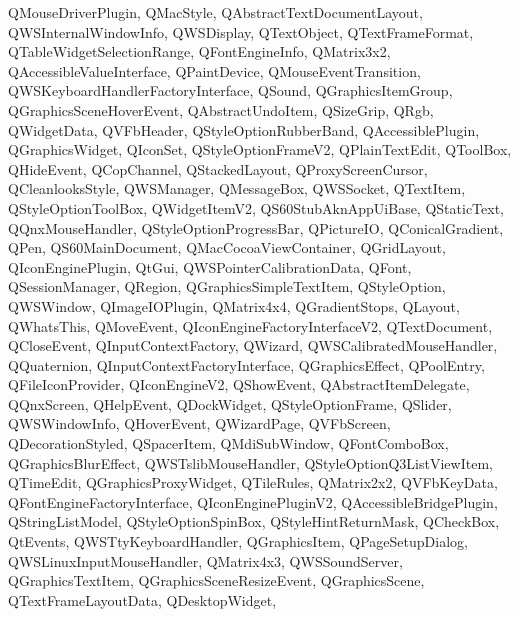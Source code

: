 {{    QMouseDriverPlugin,%
    QMacStyle,%
    QAbstractTextDocumentLayout,%
    QWSInternalWindowInfo,%
    QWSDisplay,%
    QTextObject,%
    QTextFrameFormat,%
    QTableWidgetSelectionRange,%
    QFontEngineInfo,%
    QMatrix3x2,%
    QAccessibleValueInterface,%
    QPaintDevice,%
    QMouseEventTransition,%
    QWSKeyboardHandlerFactoryInterface,%
    QSound,%
    QGraphicsItemGroup,%
    QGraphicsSceneHoverEvent,%
    QAbstractUndoItem,%
    QSizeGrip,%
    QRgb,%
    QWidgetData,%
    QVFbHeader,%
    QStyleOptionRubberBand,%
    QAccessiblePlugin,%
    QGraphicsWidget,%
    QIconSet,%
    QStyleOptionFrameV2,%
    QPlainTextEdit,%
    QToolBox,%
    QHideEvent,%
    QCopChannel,%
    QStackedLayout,%
    QProxyScreenCursor,%
    QCleanlooksStyle,%
    QWSManager,%
    QMessageBox,%
    QWSSocket,%
    QTextItem,%
    QStyleOptionToolBox,%
    QWidgetItemV2,%
    QS60StubAknAppUiBase,%
    QStaticText,%
    QQnxMouseHandler,%
    QStyleOptionProgressBar,%
    QPictureIO,%
    QConicalGradient,%
    QPen,%
    QS60MainDocument,%
    QMacCocoaViewContainer,%
    QGridLayout,%
    QIconEnginePlugin,%
    QtGui,%
    QWSPointerCalibrationData,%
    QFont,%
    QSessionManager,%
    QRegion,%
    QGraphicsSimpleTextItem,%
    QStyleOption,%
    QWSWindow,%
    QImageIOPlugin,%
    QMatrix4x4,%
    QGradientStops,%
    QLayout,%
    QWhatsThis,%
    QMoveEvent,%
    QIconEngineFactoryInterfaceV2,%
    QTextDocument,%
    QCloseEvent,%
    QInputContextFactory,%
    QWizard,%
    QWSCalibratedMouseHandler,%
    QQuaternion,%
    QInputContextFactoryInterface,%
    QGraphicsEffect,%
    QPoolEntry,%
    QFileIconProvider,%
    QIconEngineV2,%
    QShowEvent,%
    QAbstractItemDelegate,%
    QQnxScreen,%
    QHelpEvent,%
    QDockWidget,%
    QStyleOptionFrame,%
    QSlider,%
    QWSWindowInfo,%
    QHoverEvent,%
    QWizardPage,%
    QVFbScreen,%
    QDecorationStyled,%
    QSpacerItem,%
    QMdiSubWindow,%
    QFontComboBox,%
    QGraphicsBlurEffect,%
    QWSTslibMouseHandler,%
    QStyleOptionQ3ListViewItem,%
    QTimeEdit,%
    QGraphicsProxyWidget,%
    QTileRules,%
    QMatrix2x2,%
    QVFbKeyData,%
    QFontEngineFactoryInterface,%
    QIconEnginePluginV2,%
    QAccessibleBridgePlugin,%
    QStringListModel,%
    QStyleOptionSpinBox,%
    QStyleHintReturnMask,%
    QCheckBox,%
    QtEvents,%
    QWSTtyKeyboardHandler,%
    QGraphicsItem,%
    QPageSetupDialog,%
    QWSLinuxInputMouseHandler,%
    QMatrix4x3,%
    QWSSoundServer,%
    QGraphicsTextItem,%
    QGraphicsSceneResizeEvent,%
    QGraphicsScene,%
    QTextFrameLayoutData,%
    QDesktopWidget,%
}}
